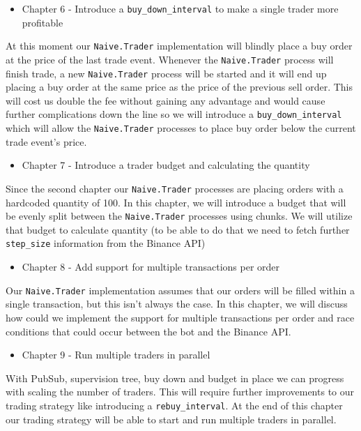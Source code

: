 \documentclass[
  oneside]{book}
\providecommand{\tightlist}{%
  \setlength{\itemsep}{0pt}\setlength{\parskip}{0pt}}
\begin{document}
\begin{itemize}
\tightlist
\item
  Chapter 6 - Introduce a \texttt{buy\_down\_interval} to make a single trader more profitable
\end{itemize}

At this moment our \texttt{Naive.Trader} implementation will blindly place a buy order at the price of the last trade event. Whenever the \texttt{Naive.Trader} process will finish trade, a new \texttt{Naive.Trader} process will be started and it will end up placing a buy order at the same price as the price of the previous sell order. This will cost us double the fee without gaining any advantage and would cause further complications down the line so we will introduce a \texttt{buy\_down\_interval} which will allow the \texttt{Naive.Trader} processes to place buy order below the current trade event's price.

\begin{itemize}
\tightlist
\item
  Chapter 7 - Introduce a trader budget and calculating the quantity
\end{itemize}

Since the second chapter our \texttt{Naive.Trader} processes are placing orders with a hardcoded quantity of 100. In this chapter, we will introduce a budget that will be evenly split between the \texttt{Naive.Trader} processes using chunks. We will utilize that budget to calculate quantity (to be able to do that we need to fetch further \texttt{step\_size} information from the Binance API)

\begin{itemize}
\tightlist
\item
  Chapter 8 - Add support for multiple transactions per order
\end{itemize}

Our \texttt{Naive.Trader} implementation assumes that our orders will be filled within a single transaction, but this isn't always the case. In this chapter, we will discuss how could we implement the support for multiple transactions per order and race conditions that could occur between the bot and the Binance API.

\begin{itemize}
\tightlist
\item
  Chapter 9 - Run multiple traders in parallel
\end{itemize}

With PubSub, supervision tree, buy down and budget in place we can progress with scaling the number of traders. This will require further improvements to our trading strategy like introducing a \texttt{rebuy\_interval}. At the end of this chapter our trading strategy will be able to start and run multiple traders in parallel.
\end{document}
